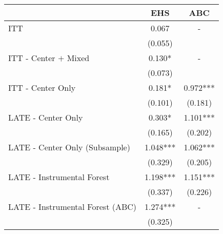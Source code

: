 \begin{tabular}{lcc}
\toprule 
\midrule 
 & EHS & ABC \\
\midrule 
ITT & 0.067 & - \\
 & (0.055) \\
ITT - Center $+$ Mixed & 0.130* & - \\
 & (0.073) \\
ITT - Center Only & 0.181* & 0.972*** \\
 & (0.101) & (0.181) \\
LATE - Center Only & 0.303* & 1.101*** \\
 & (0.165) & (0.202) \\
LATE - Center Only (Subsample) & 1.048*** & 1.062*** \\
 & (0.329) & (0.205) \\
LATE - Instrumental Forest & 1.198*** & 1.151*** \\
 & (0.337) & (0.226) \\
LATE - Instrumental Forest (ABC) & 1.274*** & - \\
 & (0.325) \\
\midrule 
\bottomrule 
\end{tabular}
